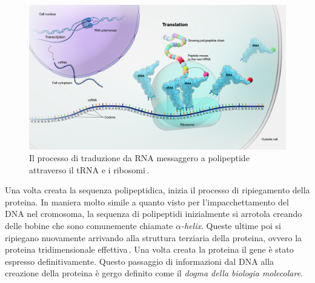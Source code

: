 \begin{figure}[b!]
    \centering
    \includegraphics[width=\textwidth]{assets/imgs/mrna-translation.jpg}
    \caption[Il processo di traduzione da \acs{mRNA} a polipeptide.]{Il processo di traduzione da \acs{RNA} messaggero a polipeptide attraverso il tRNA e i ribosomi\,\cite{nhgri_translation_image}.}\label{fig:mrna-translation}
\end{figure}

Una volta creata la sequenza polipeptidica, inizia il processo di ripiegamento della proteina. In maniera molto simile a quanto visto per l'impacchettamento del \acs{DNA} nel cromosoma, la sequenza di polipeptidi inizialmente si arrotola creando delle bobine che sono comunemente chiamate $\alpha$\textit{-helix}. Queste ultime poi si ripiegano nuovamente arrivando alla struttura terziaria della proteina, ovvero la proteina tridimensionale effettiva\,\cite{schulz2013principles}. Una volta creata la proteina il gene è stato espresso definitivamente. Questo passaggio di informazioni dal \acs{DNA} alla creazione della proteina è gergo definito come il \textsl{dogma della biologia molecolare}.

